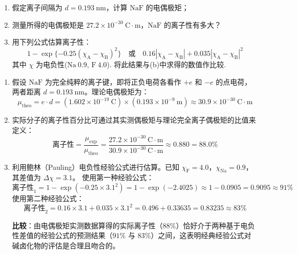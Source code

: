 \begin{exercise}\label{ex:26.4}
\begin{enumerate}
  \item[(a)] 假定离子间隔为 $d = 0.193 \ \mathrm{nm}$，计算 $\mathrm{NaF}$ 的电偶极矩；
  \item[(b)] 测量所得的电偶极矩是 $27.2 \times 10^{-30} \ \mathrm{C \cdot m}$，$\mathrm{NaF}$ 的离子性有多大？
  \item[(c)] 用下列公式估算离子性：
  $$ 1 - \exp\{-0.25(\chi_{\mathrm{A}} - \chi_{\mathrm{B}})^2\} \quad \text{或} \quad 0.16|\chi_{\mathrm{A}} - \chi_{\mathrm{B}}| + 0.035|\chi_{\mathrm{A}} - \chi_{\mathrm{B}}|^2 $$
  其中 $\chi$ 为电负性($\mathrm{Na} \ 0.9$, $\mathrm{F} \ 4.0$). 将此结果与(b)中求得的数值作比较.
\end{enumerate}
\end{exercise}
\begin{solution}
\begin{enumerate}
    \item[(a)] 假设 $\mathrm{NaF}$ 为完全纯粹的离子键，即将正负电荷各看作 $+e$ 和 $-e$ 的点电荷，两者距离 $d = 0.193 \ \mathrm{nm}$。理论电偶极矩为：
    $$ \mu_{\mathrm{theo}} = e \cdot d = (1.602 \times 10^{-19} \ \mathrm{C}) \times (0.193 \times 10^{-9} \ \mathrm{m}) \approx 30.9 \times 10^{-30} \ \mathrm{C \cdot m} $$

    \item[(b)] 实际分子的离子性百分比可通过其实测偶极矩与理论完全离子偶极矩的比值来定义：
    $$ \text{离子性} = \frac{\mu_{\mathrm{exp}}}{\mu_{\mathrm{theo}}} = \frac{27.2 \times 10^{-30} \ \mathrm{C \cdot m}}{30.9 \times 10^{-30} \ \mathrm{C \cdot m}} \approx 0.880 = 88.0\% $$

    \item[(c)] 利用鲍林（Pauling）电负性经验公式进行估算。已知 $\chi_{\mathrm{F}} = 4.0$，$\chi_{\mathrm{Na}} = 0.9$，其差值为 $\Delta \chi = 3.1$。
    使用第一种经验公式：
    $$ \text{离子性}_1 = 1 - \exp(-0.25 \times 3.1^2) = 1 - \exp(-2.4025) \approx 1 - 0.0905 = 0.9095 \approx 91\% $$
    使用第二种经验公式：
    $$ \text{离子性}_2 = 0.16 \times 3.1 + 0.035 \times 3.1^2 = 0.496 + 0.33635 = 0.83235 \approx 83\% $$
    
    \textbf{比较}：由电偶极矩实测数据算得的实际离子性（$88\%$）恰好介于两种基于电负性差值的经验公式的预测结果（$91\%$ 与 $83\%$）之间，这表明经典经验公式对碱卤化物的评估是合理且吻合的。
\end{enumerate}
\end{solution}

